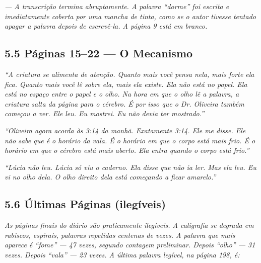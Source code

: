 \vspace{0.5em}

\noindent\textit{--- A transcrição termina abruptamente. A palavra ``dorme'' foi escrita e imediatamente coberta por uma mancha de tinta, como se o autor tivesse tentado apagar a palavra depois de escrevê-la. A página 9 está em branco.}

\vspace{1em}

\subsection*{5.5 Páginas 15--22 --- O Mecanismo}

\vspace{0.5em}

\noindent\textit{``A criatura se alimenta de atenção. Quanto mais você pensa nela, mais forte ela fica. Quanto mais você lê sobre ela, mais ela existe. Ela não está no papel. Ela está no espaço entre o papel e o olho. Na hora em que o olho lê a palavra, a criatura salta da página para o cérebro. É por isso que o Dr. Oliveira também começou a ver. Ele leu. Eu mostrei. Eu não devia ter mostrado.''
}

\vspace{0.5em}

\noindent\textit{``Oliveira agora acorda às 3:14 da manhã. Exatamente 3:14. Ele me disse. Ele não sabe que é o horário da vala. É o horário em que o corpo está mais frio. É o horário em que o cérebro está mais aberto. Ela entra quando o corpo está frio.''
}

\vspace{0.5em}

\noindent\textit{``Lúcia não leu. Lúcia só viu o caderno. Ela disse que não ia ler. Mas ela leu. Eu vi no olho dela. O olho direito dela está começando a ficar amarelo.''
}

\vspace{1em}

\subsection*{5.6 Últimas Páginas (ilegíveis)}

\vspace{0.5em}

\noindent\textit{As páginas finais do diário são praticamente ilegíveis. A caligrafia se degrada em rabiscos, espirais, palavras repetidas centenas de vezes. A palavra que mais aparece é ``fome'' --- 47 vezes, segundo contagem preliminar. Depois ``olho'' --- 31 vezes. Depois ``vala'' --- 23 vezes. A última palavra legível, na página 198, é:}

